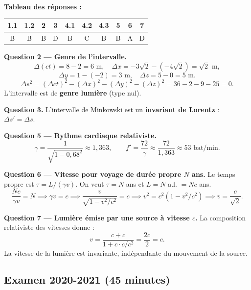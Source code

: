 \documentclass[12pt,a4paper]{article}
\begin{document}
\begin{boitecorrige}
\textbf{Tableau des réponses :}
\begin{center}
\begin{tabular}{|c|c|c|c|c|c|c|c|c|c|}
\hline
1.1 & 1.2 & 2 & 3 & 4.1 & 4.2 & 4.3 & 5 & 6 & 7 \\
\hline
B & B & B & D & B & C & B & B & A & D \\
\hline
\end{tabular}
\end{center}

\textbf{Question 2 --- Genre de l'intervalle.}
\[
\Delta(ct) = 8 - 2 = 6 \text{ m}, \quad \Delta x = -3\sqrt{2}-(-4\sqrt{2}) = \sqrt{2} \text{ m},
\]
\[
\Delta y = 1-(-2) = 3 \text{ m}, \quad \Delta z = 5-0 = 5 \text{ m}.
\]
\[
\Delta s^2 = (\Delta ct)^2 - (\Delta x)^2 - (\Delta y)^2 - (\Delta z)^2 = 36 - 2 - 9 - 25 = 0.
\]
L'intervalle est de \textbf{genre lumière} (type nul).

\textbf{Question 3.} L'intervalle de Minkowski est un \textbf{invariant de Lorentz} : $\Delta s' = \Delta s$.

\textbf{Question 5 --- Rythme cardiaque relativiste.}
\[
\gamma = \frac{1}{\sqrt{1-0{,}68^2}} \approx 1{,}363, \qquad
f' = \frac{72}{\gamma} \approx \frac{72}{1{,}363} \approx \boxed{53 \text{ bat/min}}.
\]

\textbf{Question 6 --- Vitesse pour voyage de durée propre $N$ ans.}
Le temps propre est $\tau = L/(\gamma v)$. On veut $\tau = N$ ans et $L = N$ a.l. $= Nc$ ans.
\[
\frac{Nc}{\gamma v} = N \implies \gamma v = c \implies \frac{v}{\sqrt{1-v^2/c^2}} = c
\implies v^2 = c^2(1-v^2/c^2) \implies v = \frac{c}{\sqrt{2}}.
\]

\textbf{Question 7 --- Lumière émise par une source à vitesse $c$.}
La composition relativiste des vitesses donne :
\[
v = \frac{c + c}{1 + c\cdot c/c^2} = \frac{2c}{2} = \boxed{c}.
\]
La vitesse de la lumière est invariante, indépendante du mouvement de la source.
\end{boitecorrige}

\newpage
\subsection*{Examen 2020-2021 (45 minutes)}
\end{document}
